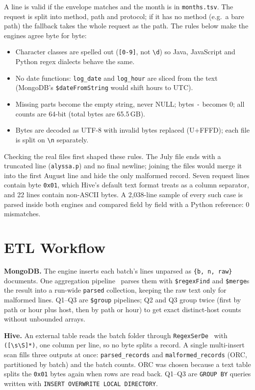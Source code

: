 \documentclass[conference]{IEEEtran}
\newcommand{\code}[1]{\texttt{\small #1}}
\begin{document}
A line is valid if the envelope matches and the month is in \code{months.tsv}. The request is
split into method, path and protocol; if it has no method (e.g.\ a bare path) the fallback
takes the whole request as the path. The rules below make the engines agree byte for byte:
\begin{itemize}
\item Character classes are spelled out (\code{[0-9]}, not \code{\textbackslash d}) so Java,
JavaScript and Python regex dialects behave the same.
\item No date functions: \code{log\_date} and \code{log\_hour} are sliced from the text
(MongoDB's \code{\$dateFromString} would shift hours to UTC).
\item Missing parts become the empty string, never NULL; bytes \code{-} becomes 0; all counts
are 64-bit (total bytes are 65.5\,GB).
\item Bytes are decoded as UTF-8 with invalid bytes replaced (U+FFFD); each file is split on
\code{\textbackslash n} separately.
\end{itemize}
Checking the real files first shaped these rules. The July file ends with a truncated line
(\code{alyssa.p}) and no final newline; joining the files would merge it into the first August
line and hide the only malformed record. Seven request lines contain byte \code{0x01}, which
Hive's default text format treats as a column separator, and 22 lines contain non-ASCII
bytes. A 2,038-line sample of every such case is parsed inside both engines and compared field
by field with a Python reference: 0 mismatches.

\section{ETL Workflow}
\textbf{MongoDB.} The engine inserts each batch's lines unparsed as \code{\{b, n, raw\}}
documents. One aggregation pipeline~\cite{mongo} parses them with \code{\$regexFind} and \code{\$merge}s
the result into a run-wide \code{parsed} collection, keeping the raw text only for malformed
lines. Q1--Q3 are \code{\$group} pipelines; Q2 and Q3 group twice (first by path or hour plus
host, then by path or hour) to get exact distinct-host counts without unbounded arrays.

\textbf{Hive.} An external table reads the batch folder through \code{RegexSerDe}~\cite{hive} with
\code{([\textbackslash s\textbackslash S]*)}, one column per line, so no byte splits a record.
A single multi-insert scan fills three outputs at once: \code{parsed\_records} and
\code{malformed\_records} (ORC, partitioned by batch) and the batch counts. ORC was chosen
because a text table splits the \code{0x01} bytes again when rows are read back. Q1--Q3 are
\code{GROUP BY} queries written with \code{INSERT OVERWRITE LOCAL DIRECTORY}.
\end{document}
